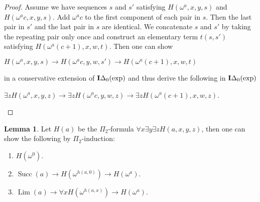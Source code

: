 \documentclass[8pt]{article}
\theoremstyle{definition}
\theoremstyle{definition}
\theoremstyle{definition}
\theoremstyle{definition}
\theoremstyle{definition}
\theoremstyle{definition}
\theoremstyle{definition}
\theoremstyle{definition}
\newtheorem{lemma}{Lemma}[section]
\theoremstyle{definition}
\theoremstyle{definition}
\theoremstyle{definition}
\theoremstyle{definition}
\theoremstyle{definition}
\theoremstyle{question}
\begin{document}
\begin{proof}
Assume we have sequences $s$ and $s'$ satisfying $H(\omega^{a}, x, y, s)$ and 
$H(\omega^{a} c, x, y, s)$. Add $\omega^{a} c$ to the first component of each pair in $s$.
Then the last pair in $s'$ and the last pair in $s$ are identical. We concatenate $s$ and $s'$ 
by taking the repeating pair only once and construct an elementary term $t(s, s')$
satisfying $H(\omega^a(c + 1), x, w, t)$. Then one can show
\begin{center}
  $H(\omega^a, x, y, s) \to H(\omega^a c, y, w, s') \to H(\omega^a(c + 1), x, w, t)$
\end{center}
in a conservative extension of ${\bf I}\Delta_0(\operatorname{exp})$ and thus derive the following in ${\bf I}\Delta_0(\operatorname{exp})$
\begin{center}
  $\exists z H(\omega^a, x, y, z) \to \exists z H(\omega^a c, y, w, z) \to \exists z H(\omega^a(c + 1), x, w, z)$.
\end{center}
\end{proof}

\begin{lemma}
  Let $H(a)$ be the $\Pi_2$-formula $\forall x \exists y \exists z H(a, x, y, z)$, then one can show the following by
  $\Pi_2$-induction:
  \begin{enumerate}
    \item $H(\omega^0)$.
    \item $\operatorname{Succ}(a) \to H(\omega^{h(a, 0)}) \to H(\omega^a)$.
    \item $\operatorname{Lim}(a) \to \forall x H(\omega^{h(a, x)}) \to H(\omega^a)$.
  \end{enumerate}
\end{lemma}
\end{document}
